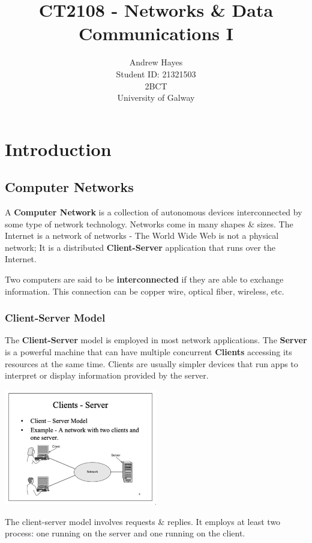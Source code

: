 \documentclass[11pt]{article}
\title{CT2108 - Networks \& Data Communications I}
\author{Andrew Hayes\\
\AND
Student ID: 21321503\\
\AND
\AND
\AND
\AND
	2BCT\\
\AND
	University of Galway\\
}
\begin{document}
\maketitle

\newpage
\tableofcontents
\thispagestyle{empty}


\newpage
\setcounter{page}{1}
\section{Introduction}
\subsection{Computer Networks}
A \textbf{Computer Network} is a collection of autonomous devices interconnected by some type of network technology. 
Networks come in many shapes \& sizes. 
The Internet is a network of networks - The World Wide Web is not a physical network; It is a distributed \textbf{Client-Server}
application that runs over the Internet.

Two computers are said to be \textbf{interconnected} if they are able to exchange information. 
This connection can be copper wire, optical fiber, wireless, etc. 

\subsubsection{Client-Server Model}
The \textbf{Client-Server} model is employed in most network applications. 
The \textbf{Server} is a powerful machine that can have multiple concurrent \textbf{Clients} accessing its resources at the 
same time. 
Clients are usually simpler devices that run apps to interpret or display information provided by the server. 

\begin{center}
\includegraphics[width=0.5\textwidth]{client-server-example.png}
\end{center}

The client-server model involves requests \& replies. 
It employs at least two process: one running on the server and one running on the client. 
\end{document}
